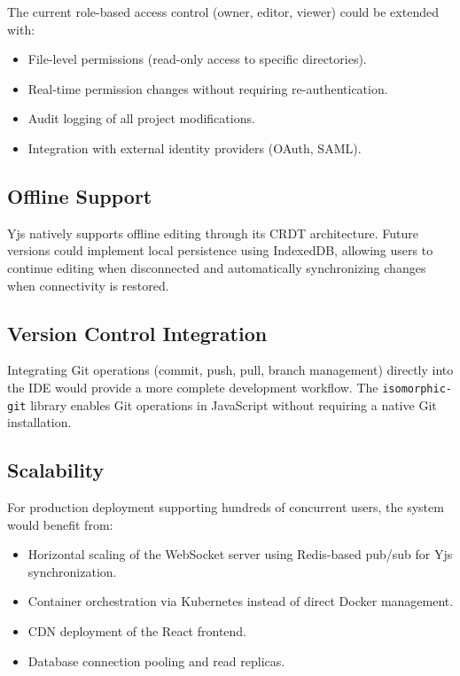 \documentclass[12pt,a4paper,oneside]{report}
\begin{document}
The current role-based access control (owner, editor, viewer) could be extended with:
\begin{itemize}
    \item File-level permissions (read-only access to specific directories).
    \item Real-time permission changes without requiring re-authentication.
    \item Audit logging of all project modifications.
    \item Integration with external identity providers (OAuth, SAML).
\end{itemize}

\subsection{Offline Support}

Yjs natively supports offline editing through its CRDT architecture. Future versions could implement local persistence using IndexedDB, allowing users to continue editing when disconnected and automatically synchronizing changes when connectivity is restored.

\subsection{Version Control Integration}

Integrating Git operations (commit, push, pull, branch management) directly into the IDE would provide a more complete development workflow. The \texttt{isomorphic-git} library enables Git operations in JavaScript without requiring a native Git installation.

\subsection{Scalability}

For production deployment supporting hundreds of concurrent users, the system would benefit from:
\begin{itemize}
    \item Horizontal scaling of the WebSocket server using Redis-based pub/sub for Yjs synchronization.
    \item Container orchestration via Kubernetes instead of direct Docker management.
    \item CDN deployment of the React frontend.
    \item Database connection pooling and read replicas.
\end{itemize}
\end{document}
